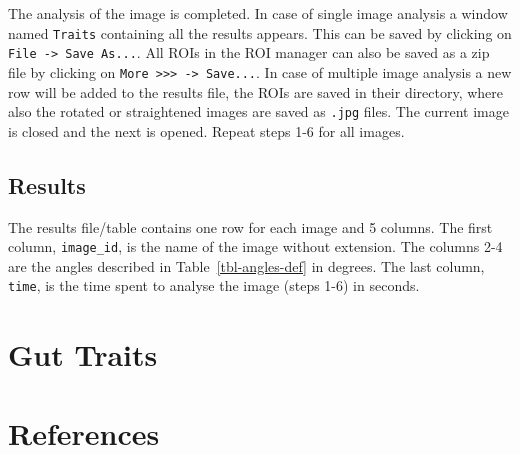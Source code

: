 \documentclass[
  letterpaper,
]{scrbook}
\begin{document}
The analysis of the image is completed. In case of single image analysis
a window named \texttt{Traits} containing all the results appears. This
can be saved by clicking on \texttt{File\ -\textgreater{}\ Save\ As...}.
All ROIs in the ROI manager can also be saved as a zip file by clicking
on
\texttt{More\ \textgreater{}\textgreater{}\textgreater{}\ -\textgreater{}\ Save...}.
In case of multiple image analysis a new row will be added to the
results file, the ROIs are saved in their directory, where also the
rotated or straightened images are saved as \texttt{.jpg} files. The
current image is closed and the next is opened. Repeat steps 1-6 for all
images.

\hypertarget{results-1}{%
\section{Results}\label{results-1}}

The results file/table contains one row for each image and 5 columns.
The first column, \texttt{image\_id}, is the name of the image without
extension. The columns 2-4 are the angles described in
Table~\ref{tbl-angles-def} in degrees. The last column, \texttt{time},
is the time spent to analyse the image (steps 1-6) in seconds.

\hypertarget{sec-gut_traits}{%
\chapter{Gut Traits}\label{sec-gut_traits}}

\hypertarget{references}{%
\chapter*{References}\label{references}}
\end{document}
